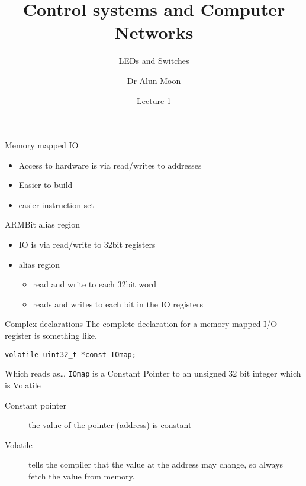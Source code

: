 \documentclass[xcolor=svgnames]{beamer}
\title{Control systems and Computer Networks}
\subtitle{LEDs and Switches}
\author{Dr Alun Moon}
\date{Lecture 1}
\begin{document}
\frame{\maketitle}


\begin{frame}{Memory mapped IO}
\begin{itemize}
    \item Access to hardware is via read/writes to addresses
    \item Easier to build
    \item easier instruction set

\end{itemize}
\end{frame}

\begin{frame}{ARM}{Bit alias region}
    \begin{itemize}
        \item IO is via read/write to 32bit registers
        \item alias region
        \begin{itemize}
            \item read and write to each 32bit word
            \item reads and writes to each bit in the IO registers
        \end{itemize}
    \end{itemize}

\end{frame}

\begin{frame}[fragile]{Complex declarations}
    The complete declaration for a memory mapped I/O register is something like.
    \begin{tcolorbox}
        \begin{verbatim}
volatile uint32_t *const IOmap;
        \end{verbatim}
    \end{tcolorbox}
    Which reads as\ldots
    \texttt{IOmap} is a \alert{Constant} \alert{Pointer} to an \alert{unsigned 32 bit integer} which is \alert{Volatile}
    \begin{description}
        \item[Constant pointer] the value of the pointer (address) is constant
        \item[Volatile] tells the compiler that the value at the address may change, so always fetch the value from memory.
    \end{description}
\end{frame}
\end{document}

